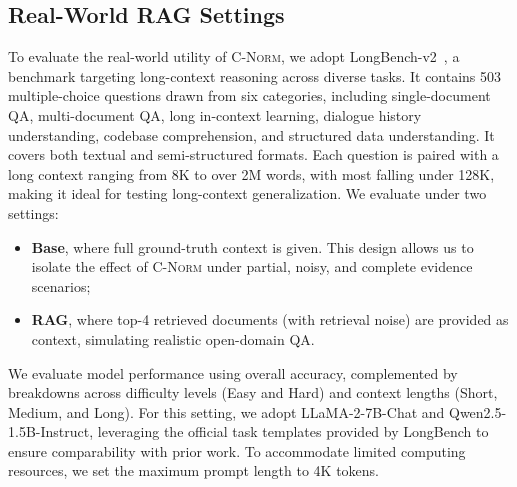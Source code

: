 \documentclass{article} %
\newcommand{\cnorm}{\textsc{C-Norm}}
\newcommand{\llamachat}{LLaMA-2-7B-Chat}
\newcommand{\qwenchat}{Qwen2.5-1.5B-Instruct}
\begin{document}
\subsection{Real-World RAG Settings}
To evaluate the real-world utility of \cnorm{}, we adopt LongBench-v2~\citep{DBLP:journals/corr/abs-2412-15204}, a benchmark targeting long-context reasoning across diverse tasks. It contains 503 multiple-choice questions drawn from six categories, including single-document QA, multi-document QA, long in-context learning, dialogue history understanding, codebase comprehension, and structured data understanding. It covers both textual and semi-structured formats. Each question is paired with a long context ranging from 8K to over 2M words, with most falling under 128K, making it ideal for testing long-context generalization.
We evaluate under two settings: 
\begin{itemize}[leftmargin=*]
    \item \textbf{Base}, where full ground-truth context is given. This design allows us to isolate the effect of \cnorm{} under partial, noisy, and complete evidence scenarios;
    \item \textbf{RAG}, where top-4 retrieved documents (with retrieval noise) are provided as context, simulating realistic open-domain QA. 
\end{itemize}
We evaluate model performance using overall accuracy, complemented by breakdowns across difficulty levels (Easy and Hard) and context lengths (Short, Medium, and Long). For this setting, we adopt \llamachat{} and \qwenchat{}, leveraging the official task templates provided by LongBench to ensure comparability with prior work. To accommodate limited computing resources, we set the maximum prompt length to 4K tokens.
\end{document}
